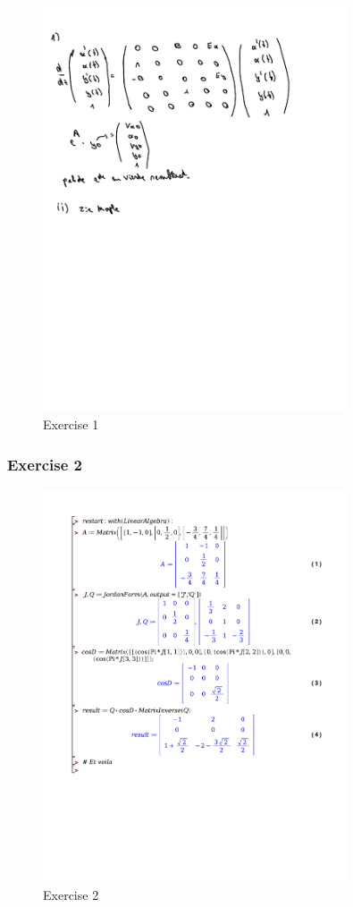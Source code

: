 \documentclass[a4paper]{report}
\begin{document}
\begin{figure}[H]
	\centering
	\includegraphics[width=0.8\textwidth]{assets/wc_3_ex_1.pdf}
	\caption{Exercise 1}
\end{figure}



\subsubsection{Exercise 2}

\begin{figure}[H]
	\centering
	\includegraphics[width=0.8\textwidth]{exercises/wc_3_ex_2.pdf}
	\caption{Exercise 2}
	\label{fig:wc_3_ex_2}
\end{figure}
\end{document}
